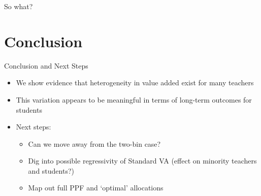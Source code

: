 \documentclass[11pt]{beamer}
\begin{document}
\begin{frame}{So what?}

    
    

\end{frame}




\section{Conclusion}


\begin{frame}{Conclusion and Next Steps}

    \begin{itemize}
        \item We show evidence that heterogeneity in value added exist for many teachers
        \item This variation appears to be meaningful in terms of long-term outcomes for students
        \item Next steps:
        \begin{itemize}
            \item Can we move away from the two-bin case?
            \item Dig into possible regressivity of Standard VA (effect on minority teachers and students?)
            \item Map out full PPF and `optimal' allocations
        \end{itemize}
    \end{itemize}

\end{frame}
\end{document}
